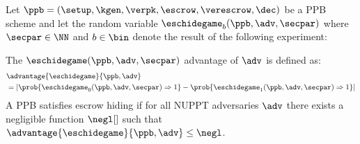 \begin{definition}
	Let $\ppb = (\setup,\allowbreak \kgen,\allowbreak \verpk,\allowbreak \escrow,\allowbreak \verescrow,\allowbreak \dec)$ be a PPB scheme and let the random variable $\eschidegame_b(\ppb, \adv, \secpar)$ where $\secpar \in \NN$ and $b \in \bin$ denote the result of the following experiment:

	The $\eschidegame(\ppb, \adv, \secpar)$ advantage of $\adv$ is defined as:
	\begin{align*}
		 & \advantage{\eschidegame}{\ppb, \adv} \\
		 & = \left|
		\prob{\eschidegame_0(\ppb, \adv, \secpar) \Rightarrow 1} - \prob{\eschidegame_1(\ppb, \adv, \secpar) \Rightarrow 1}
		\right|
	\end{align*}
	A PPB satisfies escrow hiding if for all NUPPT adversaries $\adv$ there exists a negligible function $\negl[]$ such that $\advantage{\eschidegame}{\ppb, \adv} \leq \negl$.
\end{definition}

